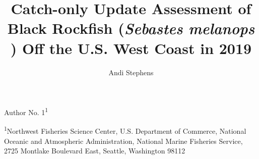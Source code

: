 \documentclass[12pt,]{article}
\title{Catch-only Update Assessment of Black Rockfish (\emph{Sebastes melanops
}) Off the U.S. West Coast in 2019}
\author{Andi Stephens}
\date{}
\begin{document}
\maketitle


\begin{center}
\thispagestyle{empty}


\vspace{.5cm}




Author No. 1\textsuperscript{1}\\

\vspace{.5cm}
% 

\vspace{.3cm}

\textsuperscript{1}Northwest Fisheries Science Center, U.S. Department of Commerce, National Oceanic and Atmospheric Administration, National Marine Fisheries Service, 2725 Montlake Boulevard East, Seattle, Washington 98112\\

\vspace{.3cm}




\end{center}
\end{document}
